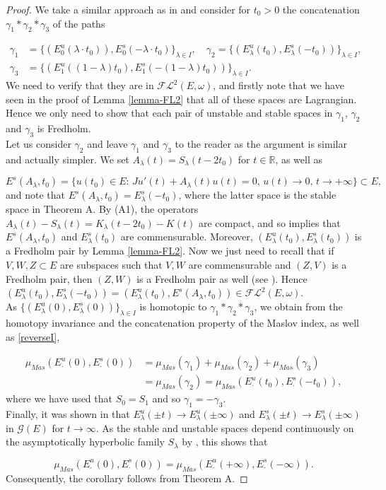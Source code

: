 \documentclass[a4paper,10pt]{article}
\begin{document}
\begin{proof}
We take a similar approach as in \cite[Prop. 3.3]{Hu} and consider for $t_0>0$ the concatenation $\gamma_1\ast\gamma_2\ast\gamma_3$ of the paths

\begin{align*}
\gamma_1&=\{(E^u_0(\lambda\cdot t_0)),E^s_0(-\lambda\cdot t_0)\}_{\lambda\in I},\quad \gamma_2=\{(E^u_\lambda(t_0),E^s_\lambda(-t_0))\}_{\lambda\in I},\\
 \gamma_3&=\{(E^u_1((1-\lambda)t_0), E^s_1(-(1-\lambda)t_0))\}_{\lambda\in I}. 
\end{align*}
We need to verify that they are in $\mathcal{FL}^2(E,\omega)$, and firstly note that we have seen in the proof of Lemma \ref{lemma-FL2} that all of these spaces are Lagrangian. Hence we only need to show that each pair of unstable and stable spaces in $\gamma_1$, $\gamma_2$ and $\gamma_3$ is Fredholm.\\
Let us consider $\gamma_2$ and leave $\gamma_1$ and $\gamma_3$ to the reader as the argument is similar and actually simpler. We set $A_\lambda(t)=S_\lambda(t-2t_0)$ for $t\in\mathbb{R}$, as well as 

\[E^s(A_\lambda,t_0)=\{u(t_0)\in E:\, Ju'(t)+A_\lambda(t)u(t)=0,\, u(t)\rightarrow 0,\, t\rightarrow +\infty\}\subset E,\]
and note that $E^s(A_\lambda,t_0)=E^s_\lambda(-t_0)$, where the latter space is the stable space in Theorem A. By (A1), the operators $A_\lambda(t)-S_\lambda(t)=K_\lambda(t-2t_0)-K(t)$ are compact, and so \cite[Thm. 3.6]{AlbertoODE} implies that $E^s(A_\lambda,t_0)$ and $E^s_\lambda(t_0)$ are commensurable. Moreover, $(E^u_\lambda(t_0),E^s_\lambda(t_0))$ is a Fredholm pair by Lemma \ref{lemma-FL2}. Now we just need to recall that if $V,W,Z\subset E$ are subspaces such that $V,W$ are commensurable and $(Z,V)$ is a Fredholm pair, then $(Z,W)$ is a Fredholm pair as well (see \cite[Prop. 2.2.1]{AlbertoBuch}). Hence $(E^u_\lambda(t_0),E^s_\lambda(-t_0))=(E^u_\lambda(t_0),E^s(A_\lambda,t_0))\in\mathcal{FL}^2(E,\omega)$.\\  
As $\{(E^u_\lambda(0),E^s_\lambda(0))\}_{\lambda\in I}$ is homotopic to $\gamma_1\ast\gamma_2\ast\gamma_3$, we obtain from the homotopy invariance and the concatenation property of the Maslov index, as well as \eqref{reverseI},

\begin{align*}
\mu_{Mas}(E^u_\cdot(0),E^s_\cdot(0))&=\mu_{Mas}(\gamma_1)+\mu_{Mas}(\gamma_2)+\mu_{Mas}(\gamma_3)\\
&=\mu_{Mas}(\gamma_2)=\mu_{Mas}(E^u_\cdot(t_0),E^s_\cdot(-t_0)),
\end{align*}
where we have used that $S_0=S_1$ and so $\gamma_1=-\gamma_3$.\\
Finally, it was shown in \cite[Thm. 2.1]{AlbertoODE} that $E^u_\lambda(\pm t)\rightarrow E^u_\lambda(\pm\infty)$ and $E^s_\lambda(\pm t)\rightarrow E^s_\lambda(\pm\infty)$ in $\mathcal{G}(E)$ for $t\rightarrow\infty$. As the stable and unstable spaces depend continuously on the asymptotically hyperbolic family $S_\lambda$ by \cite[Thm. 3.1]{AlbertoODE}, this shows that

\[\mu_{Mas}(E^u_\cdot(0),E^s_\cdot(0))=\mu_{Mas}(E^u_\cdot(+\infty),E^s_\cdot(-\infty)).\]
Consequently, the corollary follows from Theorem A.
\end{proof}
\end{document}

